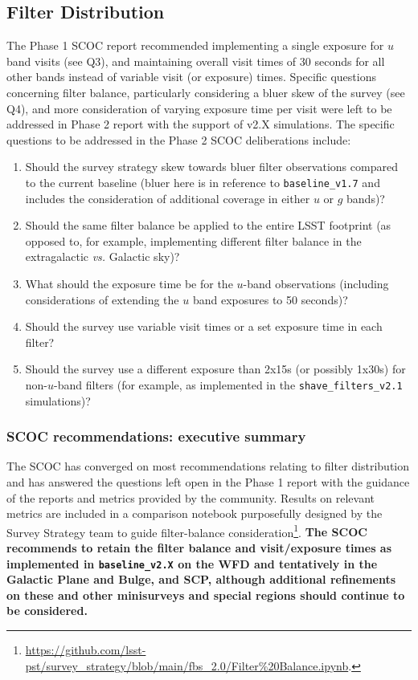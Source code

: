 \subsection{Filter Distribution}\label{q:Filters}

The Phase 1 SCOC report recommended implementing a single exposure for $u$ band visits (see  Q3), and maintaining overall visit times of 30 seconds for all other bands instead of variable visit (or exposure) times. Specific questions concerning filter balance, particularly considering a bluer skew of the survey (see  Q4), and more consideration of varying exposure time per visit were left to be addressed in Phase 2 report with the support of v2.X simulations. The specific questions to be addressed in the Phase 2 SCOC deliberations include:



\begin{enumerate}
\item Should the survey strategy skew towards bluer filter observations compared to the current baseline (bluer here is in reference to \texttt{baseline\_v1.7} and includes the consideration of additional coverage in either $u$ or $g$ bands)?
\item Should the same filter balance be applied to the entire LSST footprint (as opposed to, for example, implementing different filter balance in the extragalactic \emph{vs.} Galactic sky)?
\item What should the exposure time be for the $u$-band observations (including considerations of extending the $u$ band exposures to 50 seconds)? 
\item Should the survey use variable visit times or a set exposure time in each filter?
\item Should the survey use a different exposure than 2x15s (or possibly 1x30s) for non-$u$-band filters (for example, as implemented in the \texttt{shave\_filters\_v2.1} simulations)?
\end{enumerate}

\subsubsection{SCOC recommendations: executive summary }\label{rec:filterdist_es}

The SCOC has converged on most recommendations relating to filter distribution and has answered the questions left open in the Phase 1 report with the guidance of the reports and metrics provided by the community. Results on relevant metrics are included in a comparison notebook purposefully designed by the Survey Strategy team to guide filter-balance consideration\footnote{\url{https://github.com/lsst-pst/survey_strategy/blob/main/fbs_2.0/Filter\%20Balance.ipynb}.}. {\bf The SCOC recommends to retain the filter balance and visit/exposure times as implemented in \texttt{baseline\_v2.X} on the WFD and tentatively in the Galactic Plane and Bulge, and SCP, although additional refinements on these and other minisurveys and special regions should continue to be considered.}

